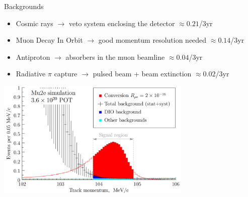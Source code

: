 \documentclass[10pt]{beamer}
\begin{document}
\begin{frame}{Backgrounds}
\begin{itemize}
\setlength\itemsep{0.2cm}
\item Cosmic rays $\rightarrow$ veto system enclosing the detector \hfill $\approx0.21$/3yr
\item Muon Decay In Orbit $\rightarrow$ good momentum resolution needed \hfill $\approx0.14$/3yr
\item Antiproton $\rightarrow$ absorbers in the muon beamline \hfill $\approx0.04$/3yr
\item Radiative $\pi$ capture $\rightarrow$ pulsed beam + beam extinction \hfill $\approx0.02$/3yr
\end{itemize}
\vspace{0.2cm}
\centering
\includegraphics[width=0.7\textwidth]{signal_bg}
\end{frame}
\end{document}
